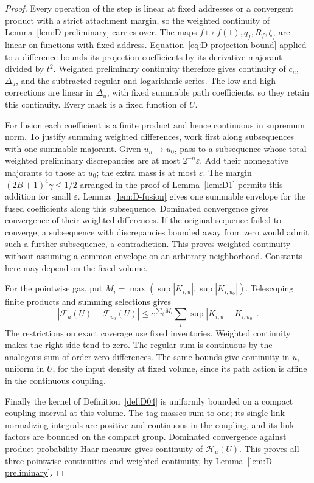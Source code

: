 \begin{proof}
Every operation of the step is linear at fixed addresses or a convergent product with a strict attachment margin, so the weighted continuity of Lemma~\ref{lem:D-preliminary} carries over. The maps $f\mapsto f(1),q_f,R_f,\zeta_f$ are linear on functions with fixed address. Equation~\eqref{eq:D-projection-bound} applied to a difference bounds its projection coefficients by its derivative majorant divided by $t^2$. Weighted preliminary continuity therefore gives continuity of $c_u$, $\Delta_u$, and the subtracted regular and logarithmic series. The low and high corrections are linear in $\Delta_u$, with fixed summable path coefficients, so they retain this continuity. Every mask is a fixed function of $U$.

For fusion each coefficient is a finite product and hence continuous in supremum norm. To justify summing weighted differences, work first along subsequences with one summable majorant. Given $u_n\to u_0$, pass to a subsequence whose total weighted preliminary discrepancies are at most $2^{-n}\varepsilon$. Add their nonnegative majorants to those at $u_0$; the extra mass is at most $\varepsilon$. The margin $(2B+1)^4\gamma\le1/2$ arranged in the proof of Lemma~\ref{lem:D1} permits this addition for small $\varepsilon$. Lemma~\ref{lem:D-fusion} gives one summable envelope for the fused coefficients along this subsequence. Dominated convergence gives convergence of their weighted differences. If the original sequence failed to converge, a subsequence with discrepancies bounded away from zero would admit such a further subsequence, a contradiction. This proves weighted continuity without assuming a common envelope on an arbitrary neighborhood. Constants here may depend on the fixed volume.

For the pointwise gas, put $M_i=\max(\sup|K_{i,u}|,\sup|K_{i,u_0}|)$. Telescoping finite products and summing selections gives
\begin{equation*}
|\mathcal F_u(U)-\mathcal F_{u_0}(U)|
\le e^{\sum_iM_i}\sum_i\sup|K_{i,u}-K_{i,u_0}|\,.
\end{equation*}
The restrictions on exact coverage use fixed inventories. Weighted continuity makes the right side tend to zero. The regular sum is continuous by the analogous sum of order-zero differences. The same bounds give continuity in $u$, uniform in $U$, for the input density at fixed volume, since its path action is affine in the continuous coupling.

Finally the kernel of Definition~\ref{def:D04} is uniformly bounded on a compact coupling interval at this volume. The tag masses sum to one; its single-link normalizing integrals are positive and continuous in the coupling, and its link factors are bounded on the compact group. Dominated convergence against product probability Haar measure gives continuity of $\mathcal H_u(U)$. This proves all three pointwise continuities and weighted continuity, by Lemma~\ref{lem:D-preliminary}.
\end{proof}

